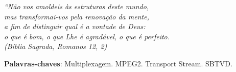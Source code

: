 \documentclass[
	12pt,				%
	openright,			%
	twoside,			%
	a4paper,			%
	english,			%
	french,				%
	brazil				%
	]{abntex2}
\begin{document}
\begin{agradecimentos}
%

\end{agradecimentos}

\begin{epigrafe}
    \vspace*{\fill}
	\begin{flushright}
		\textit{``Não vos amoldeis às estruturas deste mundo, \\
		mas transformai-vos pela renovação da mente, \\
		a fim de distinguir qual é a vontade de Deus: \\
		o que é bom, o que Lhe é agradável, o que é perfeito.\\
		(Bíblia Sagrada, Romanos 12, 2)}
	\end{flushright}
\end{epigrafe}


\setlength{\absparsep}{18pt} %
\begin{resumo}

 \textbf{Palavras-chaves}: Multiplexagem. MPEG2. Transport Stream. SBTVD.
\end{resumo}
\end{document}
